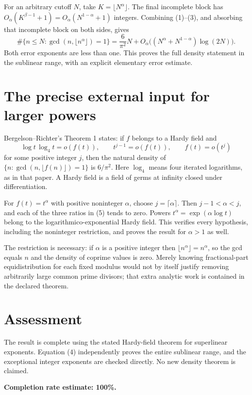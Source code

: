 \documentclass[11pt]{article}
\begin{document}
For an arbitrary cutoff $N$, take $K=\lfloor N^\alpha\rfloor$. The final incomplete block has $O_\alpha(K^{\beta-1}+1)=O_\alpha(N^{1-\alpha}+1)$ integers. Combining (1)--(3), and absorbing that incomplete block on both sides, gives
\[
 \#\{n\le N:\gcd(n,\lfloor n^\alpha\rfloor)=1\}
 =\frac6{\pi^2}N+
 O_\alpha\bigl((N^\alpha+N^{1-\alpha})\log(2N)\bigr).
\tag{4}
\]
Both error exponents are less than one. This proves the full density statement in the sublinear range, with an explicit elementary error estimate.

\section*{The precise external input for larger powers}
Bergelson--Richter's Theorem 1 states: if $f$ belongs to a Hardy field and
\[
 \log t\,\log_4t=o(f(t)),\qquad
 t^{j-1}=o(f(t)),\qquad f(t)=o(t^j)
\tag{5}
\]
for some positive integer $j$, then the natural density of $\{n:\gcd(n,\lfloor f(n)\rfloor)=1\}$ is $6/\pi^2$. Here $\log_4$ means four iterated logarithms, as in that paper. A Hardy field is a field of germs at infinity closed under differentiation.

For $f(t)=t^\alpha$ with positive noninteger $\alpha$, choose $j=\lceil\alpha\rceil$. Then $j-1<\alpha<j$, and each of the three ratios in (5) tends to zero. Powers $t^\alpha=\exp(\alpha\log t)$ belong to the logarithmico-exponential Hardy field. This verifies every hypothesis, including the noninteger restriction, and proves the result for $\alpha>1$ as well.

The restriction is necessary: if $\alpha$ is a positive integer then $\lfloor n^\alpha\rfloor=n^\alpha$, so the gcd equals $n$ and the density of coprime values is zero. Merely knowing fractional-part equidistribution for each fixed modulus would not by itself justify removing arbitrarily large common prime divisors; that extra analytic work is contained in the declared theorem.

\section*{Assessment}
The result is complete using the stated Hardy-field theorem for superlinear exponents. Equation (4) independently proves the entire sublinear range, and the exceptional integer exponents are checked directly. No new density theorem is claimed.

\textbf{Completion rate estimate: 100\%.}
\end{document}
